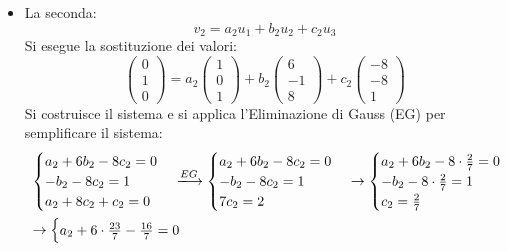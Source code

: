 \documentclass[a4paper]{article}
\begin{document}
\begin{itemize}
		\item La seconda:
		\begin{equation*}
			v_{2} = a_{2} u_{1} + b_{2} u_{2} + c_{2} u_{3}
		\end{equation*}
		Si esegue la sostituzione dei valori:
		\begin{equation*}
			\begin{pmatrix}
				0 \\ 1 \\ 0
			\end{pmatrix} =
			a_{2} \begin{pmatrix}
				1 \\ 0 \\ 1
			\end{pmatrix} +
			b_{2} \begin{pmatrix}
				6 \\ -1 \\ 8
			\end{pmatrix} +
			c_{2} \begin{pmatrix}
				-8 \\ -8 \\ 1
			\end{pmatrix}
		\end{equation*}
		Si costruisce il sistema e si applica l'Eliminazione di Gauss (EG) per semplificare il sistema:
		\begin{equation*}
			\begin{array}{l}
				\begin{cases}
					a_{2} + 6b_{2} - 8c_{2} = 0 \\
					-b_{2} - 8c_{2} = 1 \\
					a_{2} + 8c_{2} + c_{2} = 0
				\end{cases} \xlongrightarrow{EG}
				\begin{cases}
					a_{2} + 6b_{2} - 8c_{2} = 0 \\
					-b_{2} - 8c_{2} = 1 \\
					7c_{2} = 2
				\end{cases} \rightarrow
				\begin{cases}
					a_{2} + 6b_{2} - 8 \cdot \frac{2}{7} = 0 \\
					-b_{2} - 8 \cdot \frac{2}{7} = 1 \\
					c_{2} = \frac{2}{7}
				\end{cases} \\ [2em]
				\rightarrow \begin{cases}
					a_{2} + 6 \cdot \frac{23}{7} - \frac{16}{7} = 0 \\

\end{cases}
\end{array}
\end{equation*}
\end{itemize}
\end{document}
